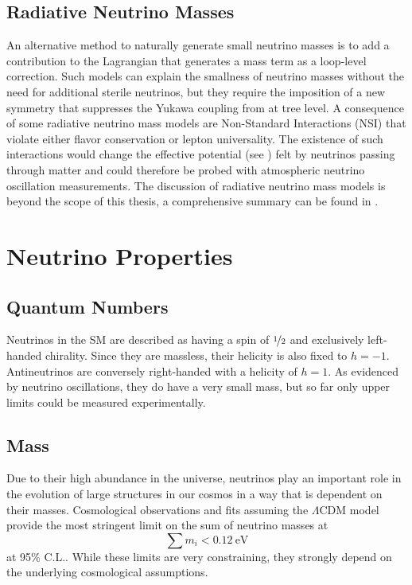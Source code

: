 \subsection{Radiative Neutrino Masses}
An alternative method to naturally generate small neutrino masses is to add a contribution to the Lagrangian that generates a mass term as a loop-level correction.
Such models can explain the smallness of neutrino masses without the need for additional sterile neutrinos, but they require the imposition of a new symmetry that suppresses the Yukawa coupling from  at tree level.
A consequence of some radiative neutrino mass models are Non-Standard Interactions (NSI) that violate either flavor conservation or lepton universality.
The existence of such interactions would change the effective potential (see ) felt by neutrinos passing through matter and could therefore be probed with atmospheric neutrino oscillation measurements.
The discussion of radiative neutrino mass models is beyond the scope of this thesis, a comprehensive summary can be found in .

\section{Neutrino Properties}

\subsection{Quantum Numbers}
Neutrinos in the SM are described as having a spin of $\nicefrac{1}{2}$ and exclusively left-handed chirality.
Since they are massless, their helicity is also fixed to $h=-1$.
Antineutrinos are conversely right-handed with a helicity of $h=1$.
As evidenced by neutrino oscillations, they do have a very small mass, but so far only upper limits could be measured experimentally.

\subsection{Mass}
Due to their high abundance in the universe, neutrinos play an important role in the evolution of large structures in our cosmos in a way that is dependent on their masses.
Cosmological observations and fits assuming the $\Lambda$CDM model provide the most stringent limit on the sum of neutrino masses at
\begin{equation}
    \sum m_i < \SI{0.12}{\eV}
\end{equation}
at 95\% C.L..
While these limits are very constraining, they strongly depend on the underlying cosmological assumptions.


